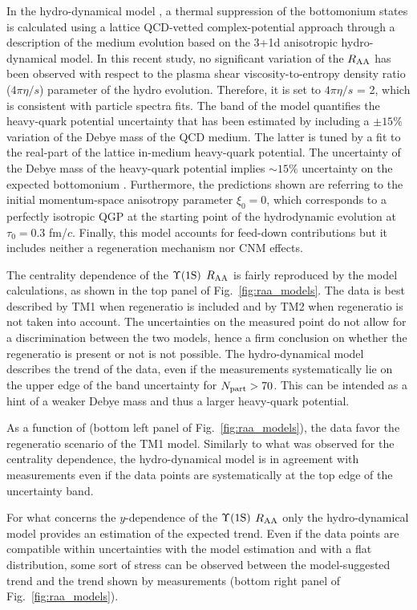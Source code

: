 In the hydro-dynamical model \cite{Krouppa:2017jlg}, a thermal suppression of the bottomonium states is calculated using a lattice QCD-vetted complex-potential approach through a description of the medium evolution based on the 3+1d anisotropic hydro-dynamical model.
 In this recent study, no significant variation of the $\mbox{$R_{\rm{AA}}$}$ has been observed with respect to the plasma shear viscosity-to-entropy density ratio ($4\pi\eta/s$) parameter of the hydro evolution. 
Therefore, it is set to $4\pi\eta/s$ = 2, which is consistent with particle spectra fits.
The band of the model quantifies the heavy-quark potential uncertainty that has been estimated by including a $\pm 15\%$ variation of the Debye mass of the QCD medium.
The latter is tuned by a fit to the real-part of the lattice in-medium heavy-quark potential.
The uncertainty of the Debye mass of the heavy-quark potential implies $\sim15\%$ uncertainty on the expected bottomonium \raa. 
Furthermore, the predictions shown are referring to the initial momentum-space anisotropy parameter $\xi_0=0$, which corresponds to a perfectly isotropic QGP at the starting point of the hydrodynamic evolution at $\tau_0=0.3$ fm/$c$.
Finally, this model accounts for feed-down contributions but it includes neither a regeneration mechanism nor CNM effects. 

The centrality dependence of the $\mbox{$\Upsilon$(1S)}$ $\mbox{$R_{\rm{AA}}$}$ is fairly reproduced by the model calculations, as shown in the top panel of Fig.~\ref{fig:raa_models}.
The data is best described by TM1 when regeneratio is included and by TM2 when regeneratio is not taken into account.
The uncertainties on the measured point do not allow for a discrimination between the two models, hence a firm conclusion on whether the regeneratio is present or not is not possible. 
The hydro-dynamical model describes the trend of the data, even if the measurements systematically lie on the upper edge of the band uncertainty for $\mbox{$N_{\rm{part}}$}>70$.
This can be intended as a hint of a weaker Debye mass and thus a larger heavy-quark potential.

As a function of \pt (bottom left panel of Fig.~\ref{fig:raa_models}), the data favor the regeneratio scenario of the TM1 model.
Similarly to what was observed for the centrality dependence, the hydro-dynamical model is in agreement with measurements even if the data points are systematically at the top edge of the uncertainty band.

For what concerns the $y$-dependence of the $\mbox{$\Upsilon$(1S)}$ $\mbox{$R_{\rm{AA}}$}$ only the hydro-dynamical model provides an estimation of the expected trend.
Even if the data points are compatible within uncertainties with the model estimation and with a flat distribution, some sort of stress can be observed between the model-suggested trend and the trend shown by measurements (bottom right panel of Fig.~\ref{fig:raa_models}).

